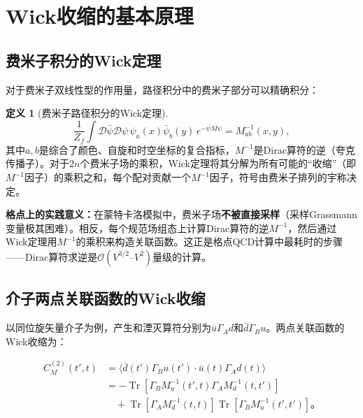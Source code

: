 \documentclass[12pt,a4paper]{ctexart}
\theoremstyle{definition}
\newtheorem{definition}{定义}[section]
\begin{document}
\section{Wick收缩的基本原理}

\subsection{费米子积分的Wick定理}

对于费米子双线性型的作用量，路径积分中的费米子部分可以精确积分\cite{Peardon2009,NoteGluonPDFs}：

\begin{definition}[费米子路径积分的Wick定理]
\begin{equation}
\boxed{\frac{1}{Z_f} \int \mathcal{D}\bar{\psi}\mathcal{D}\psi \, \psi_{a}(x)\bar{\psi}_{b}(y) \, e^{-\bar{\psi}M\psi} = M^{-1}_{ab}(x,y)},
\label{eq:wick_2pt}
\end{equation}
其中$a,b$是综合了颜色、自旋和时空坐标的复合指标，$M^{-1}$是Dirac算符的逆（夸克传播子）。对于$2n$个费米子场的乘积，Wick定理将其分解为所有可能的``收缩''（即$M^{-1}$因子）的乘积之和，每个配对贡献一个$M^{-1}$因子，符号由费米子排列的宇称决定。
\end{definition}

\textbf{格点上的实践意义：}在蒙特卡洛模拟中，费米子场\textbf{不被直接采样}（采样Grassmann变量极其困难）。相反，每个规范场组态上计算Dirac算符的逆$M^{-1}$，然后通过Wick定理用$M^{-1}$的乘积来构造关联函数。这正是格点QCD计算中最耗时的步骤——Dirac算符求逆是$\mathcal{O}(V^{3/2}\text{--}V^2)$量级的计算。

\subsection{介子两点关联函数的Wick收缩}

以同位旋矢量介子为例，产生和湮灭算符分别为$\bar{u}\Gamma_A d$和$\bar{d}\Gamma_B u$\cite{Peardon2009}。两点关联函数的Wick收缩为：

\begin{equation}
\begin{aligned}
C^{(2)}_M(t', t) &= \langle \bar{d}(t')\Gamma_B u(t') \cdot \bar{u}(t)\Gamma_A d(t) \rangle \\
&= -\operatorname{Tr}\left[ \Gamma_B M^{-1}_u(t', t) \Gamma_A M^{-1}_d(t, t') \right] \\
&\quad + \operatorname{Tr}\left[ \Gamma_A M^{-1}_d(t, t) \right] \operatorname{Tr}\left[ \Gamma_B M^{-1}_u(t', t') \right]。
\end{aligned}
\label{eq:meson_wick}
\end{equation}
\end{document}
